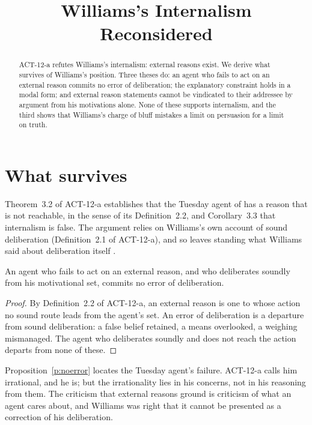\documentclass{situationist-preprint}
\title{Williams's Internalism Reconsidered}
\begin{document}
\maketitle

\begin{abstract}
ACT-12-a refutes Williams's internalism: external reasons exist. We derive what survives of Williams's position. Three theses do: an agent who fails to act on an external reason commits no error of deliberation; the explanatory constraint holds in a modal form; and external reason statements cannot be vindicated to their addressee by argument from his motivations alone. None of these supports internalism, and the third shows that Williams's charge of bluff mistakes a limit on persuasion for a limit on truth.
\end{abstract}

\section{What survives}

Theorem~3.2 of ACT-12-a establishes that the Tuesday agent of \citet{Parfit1984} has a reason that is not reachable, in the sense of its Definition~2.2, and Corollary~3.3 that internalism is false. The argument relies on Williams's own account of sound deliberation (Definition~2.1 of ACT-12-a), and so leaves standing what Williams said about deliberation itself \citep{Williams1981}.

\begin{proposition}\label{p:noerror}
An agent who fails to act on an external reason, and who deliberates soundly from his motivational set, commits no error of deliberation.
\end{proposition}

\begin{proof}
By Definition~2.2 of ACT-12-a, an external reason is one to whose action no sound route leads from the agent's set. An error of deliberation is a departure from sound deliberation: a false belief retained, a means overlooked, a weighing mismanaged. The agent who deliberates soundly and does not reach the action departs from none of these.
\end{proof}

Proposition~\ref{p:noerror} locates the Tuesday agent's failure. ACT-12-a calls him irrational, and he is; but the irrationality lies in his concerns, not in his reasoning from them. The criticism that external reasons ground is criticism of what an agent cares about, and Williams was right that it cannot be presented as a correction of his deliberation.
\end{document}
